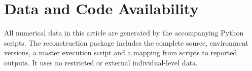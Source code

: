 \documentclass[12pt,letterpaper,oneside]{article}
\begin{document}
\section*{Data and Code Availability}
All numerical data in this article are generated by the accompanying Python scripts. The reconstruction package includes the complete source, environment versions, a master execution script and a mapping from scripts to reported outputs. It uses no restricted or external individual-level data.



\end{document}
